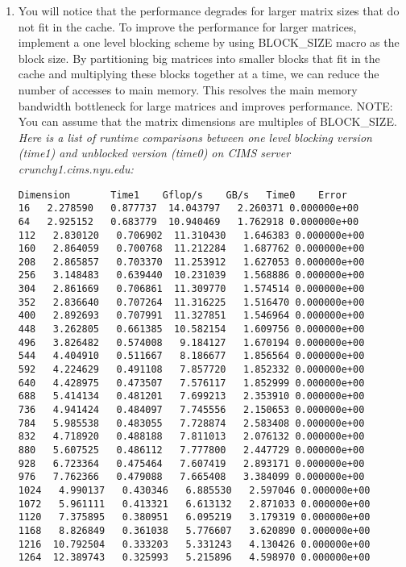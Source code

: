 \documentclass{article}
\begin{document}
\begin{enumerate}
\begin{enumerate}
    \item You will notice that the performance degrades for larger matrix sizes that do not fit in the cache. To improve the performance for larger matrices, implement a one level blocking scheme by using BLOCK\_SIZE macro as the block size. By partitioning big matrices into smaller blocks that fit in the cache and multiplying these blocks together at a time, we can reduce the number of accesses to main memory. This resolves the main memory bandwidth bottleneck for large matrices and improves performance. NOTE: You can assume that the matrix dimensions are multiples of BLOCK\_SIZE.
    \newline \textit{Here is a list of runtime comparisons between one level blocking version (time1) and unblocked version (time0) on CIMS server \\crunchy1.cims.nyu.edu:}
    \begin{verbatim}
Dimension       Time1    Gflop/s    GB/s   Time0    Error
16   2.278590   0.877737  14.043797   2.260371 0.000000e+00
64   2.925152   0.683779  10.940469   1.762918 0.000000e+00
112   2.830120   0.706902  11.310430   1.646383 0.000000e+00
160   2.864059   0.700768  11.212284   1.687762 0.000000e+00
208   2.865857   0.703370  11.253912   1.627053 0.000000e+00
256   3.148483   0.639440  10.231039   1.568886 0.000000e+00
304   2.861669   0.706861  11.309770   1.574514 0.000000e+00
352   2.836640   0.707264  11.316225   1.516470 0.000000e+00
400   2.892693   0.707991  11.327851   1.546964 0.000000e+00
448   3.262805   0.661385  10.582154   1.609756 0.000000e+00
496   3.826482   0.574008   9.184127   1.670194 0.000000e+00
544   4.404910   0.511667   8.186677   1.856564 0.000000e+00
592   4.224629   0.491108   7.857720   1.852332 0.000000e+00
640   4.428975   0.473507   7.576117   1.852999 0.000000e+00
688   5.414134   0.481201   7.699213   2.353910 0.000000e+00
736   4.941424   0.484097   7.745556   2.150653 0.000000e+00
784   5.985538   0.483055   7.728874   2.583408 0.000000e+00
832   4.718920   0.488188   7.811013   2.076132 0.000000e+00
880   5.607525   0.486112   7.777800   2.447729 0.000000e+00
928   6.723364   0.475464   7.607419   2.893171 0.000000e+00
976   7.762366   0.479088   7.665408   3.384099 0.000000e+00
1024   4.990137   0.430346   6.885530   2.597046 0.000000e+00
1072   5.961111   0.413321   6.613132   2.871033 0.000000e+00
1120   7.375895   0.380951   6.095219   3.179319 0.000000e+00
1168   8.826849   0.361038   5.776607   3.620890 0.000000e+00
1216  10.792504   0.333203   5.331243   4.130426 0.000000e+00
1264  12.389743   0.325993   5.215896   4.598970 0.000000e+00

\end{verbatim}
\end{enumerate}
\end{enumerate}
\end{document}
